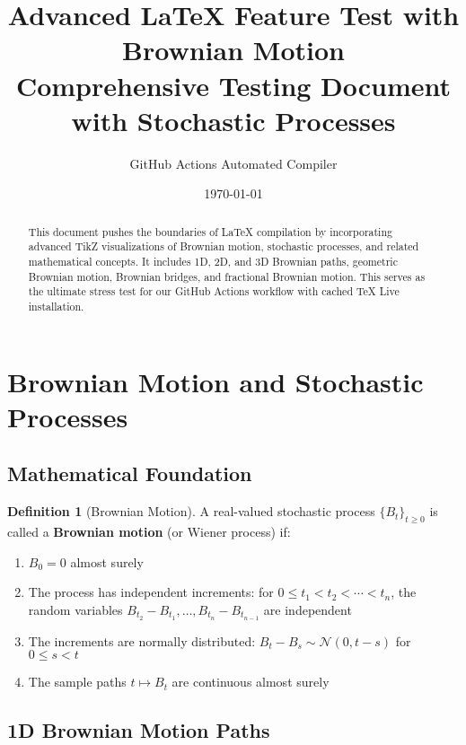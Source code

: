 \documentclass[12pt,a4paper,twoside]{article}
\title{\textbf{Advanced LaTeX Feature Test with Brownian Motion}\\
       \large Comprehensive Testing Document with Stochastic Processes}
\author{GitHub Actions Automated Compiler}
\date{\today}
\theoremstyle{definition}
\newtheorem{definition}[theorem]{Definition}
\newcommand{\brownian}{B}
\begin{document}
\maketitle

\begin{abstract}
This document pushes the boundaries of LaTeX compilation by incorporating advanced TikZ visualizations of Brownian motion, stochastic processes, and related mathematical concepts. It includes 1D, 2D, and 3D Brownian paths, geometric Brownian motion, Brownian bridges, and fractional Brownian motion. This serves as the ultimate stress test for our GitHub Actions workflow with cached TeX Live installation.
\end{abstract}

\tableofcontents
\newpage

\section{Brownian Motion and Stochastic Processes}

\subsection{Mathematical Foundation}

\begin{definition}[Brownian Motion]
A real-valued stochastic process $\{\brownian_t\}_{t \geq 0}$ is called a \textbf{Brownian motion} (or Wiener process) if:
\begin{enumerate}
\item $\brownian_0 = 0$ almost surely
\item The process has independent increments: for $0 \leq t_1 < t_2 < \cdots < t_n$, the random variables $\brownian_{t_2} - \brownian_{t_1}, \ldots, \brownian_{t_n} - \brownian_{t_{n-1}}$ are independent
\item The increments are normally distributed: $\brownian_t - \brownian_s \sim \mathcal{N}(0, t-s)$ for $0 \leq s < t$
\item The sample paths $t \mapsto \brownian_t$ are continuous almost surely
\end{enumerate}
\end{definition}

\subsection{1D Brownian Motion Paths}
\end{document}
